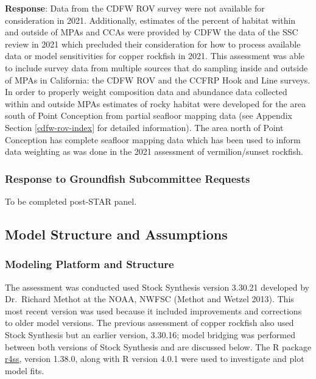\documentclass[11pt,
  english,
  letterpaper,
]{article}
\begin{document}
\textbf{Response}: Data from the CDFW ROV survey were not available for consideration in 2021. Additionally, estimates of the percent of habitat within and outside of MPAs and CCAs were provided by CDFW the data of the SSC review in 2021 which precluded their consideration for how to process available data or model sensitivities for copper rockfish in 2021. This assessment was able to include survey data from multiple sources that do sampling inside and outside of MPAs in California: the CDFW ROV and the CCFRP Hook and Line surveys. In order to properly weight composition data and abundance data collected within and outside MPAs estimates of rocky habitat were developed for the area south of Point Conception from partial seafloor mapping data (see Appendix Section \ref{cdfw-rov-index} for detailed information). The area north of Point Conception has complete seafloor mapping data which has been used to inform data weighting as was done in the 2021 assessment of vermilion/sunset rockfish.

\hypertarget{response-to-groundfish-subcommittee-requests}{%
\subsubsection{Response to Groundfish Subcommittee Requests}\label{response-to-groundfish-subcommittee-requests}}

To be completed post-STAR panel.

\hypertarget{model-structure-and-assumptions}{%
\subsection{Model Structure and Assumptions}\label{model-structure-and-assumptions}}

\hypertarget{modeling-platform-and-structure}{%
\subsubsection{Modeling Platform and Structure}\label{modeling-platform-and-structure}}

The assessment was conducted used Stock Synthesis version 3.30.21 developed by Dr.~Richard Methot at the NOAA, NWFSC (Methot and Wetzel 2013). This most recent version was used because it included improvements and corrections to older model versions. The previous assessment of copper rockfish also used Stock Synthesis but an earlier version, 3.30.16; model bridging was performed between both versions of Stock Synthesis and are discussed below. The R package \href{https://github.com/r4ss/r4ss}{r4ss}, version 1.38.0, along with R version 4.0.1 were used to investigate and plot model fits.
\end{document}
